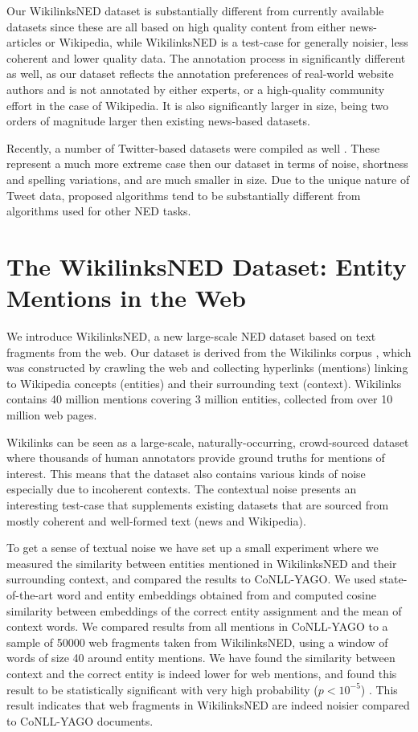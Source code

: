 \documentclass[11pt]{article}
\begin{document}
	Our WikilinksNED dataset is substantially different from currently available datasets since these are all based on high quality content from either news-articles or Wikipedia, while WikilinksNED is a test-case for generally noisier, less coherent and lower quality data. The annotation process in significantly different as well, as our dataset reflects the annotation preferences of real-world website authors and is not annotated by either experts, or a high-quality community effort in the case of Wikipedia. It is also significantly larger in size, being two orders of magnitude larger then existing news-based datasets.
	
	Recently, a number of Twitter-based datasets were compiled as well \cite{fromreide2014crowdsourcing}. These represent a much more extreme case then our dataset in terms of noise, shortness and spelling variations, and are much smaller in size. Due to the unique nature of Tweet data, proposed algorithms tend to be substantially different from algorithms used for other NED tasks.
	
	\section{The WikilinksNED Dataset: \qquad\qquad Entity Mentions in the Web}
	\label{sec:w}
	
	We introduce WikilinksNED, a new large-scale NED dataset based on text fragments from the web. Our dataset is derived from the Wikilinks corpus \cite{singh12:wiki-links}, which was constructed by crawling the web and collecting hyperlinks (mentions) linking to Wikipedia concepts (entities) and their surrounding text (context). Wikilinks contains 40 million mentions covering 3 million entities, collected from over 10 million web pages. 
	
	Wikilinks can be seen as a large-scale, naturally-occurring, crowd-sourced dataset where thousands of human annotators provide ground truths for mentions of interest. This means that the dataset also contains various kinds of noise especially due to incoherent contexts. The contextual noise presents an interesting test-case that supplements existing datasets that are sourced from mostly coherent and well-formed text (news and Wikipedia). 
	
	To get a sense of textual noise we have set up a small experiment where we measured the similarity between entities mentioned in WikilinksNED and their surrounding context, and compared the results to CoNLL-YAGO. We used state-of-the-art word and entity embeddings obtained from  and computed cosine similarity between embeddings of the correct entity assignment and the mean of context words. We compared results from all mentions in CoNLL-YAGO to a sample of 50000 web fragments taken from WikilinksNED, using a window of words of size 40 around entity mentions. We have found the similarity between context and the correct entity is indeed lower for web mentions, and found this result to be statistically significant with very high probability ($p<10^{-5}$) . This result indicates that web fragments in WikilinksNED are indeed noisier compared to CoNLL-YAGO documents.
	
\end{document}
